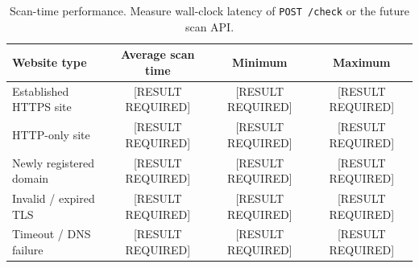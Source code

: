 \begin{table}[!t]
\centering
\caption{Scan-time performance.
Measure wall-clock latency of \texttt{POST /check} or the future scan API.}
\label{tab:scan-perf}
\begin{tabular}{lccc}
\toprule
Website type & Average scan time & Minimum & Maximum \\
\midrule
Established HTTPS site & [RESULT REQUIRED] & [RESULT REQUIRED] & [RESULT REQUIRED] \\
HTTP-only site & [RESULT REQUIRED] & [RESULT REQUIRED] & [RESULT REQUIRED] \\
Newly registered domain & [RESULT REQUIRED] & [RESULT REQUIRED] & [RESULT REQUIRED] \\
Invalid / expired TLS & [RESULT REQUIRED] & [RESULT REQUIRED] & [RESULT REQUIRED] \\
Timeout / DNS failure & [RESULT REQUIRED] & [RESULT REQUIRED] & [RESULT REQUIRED] \\
\bottomrule
\end{tabular}
\end{table}

